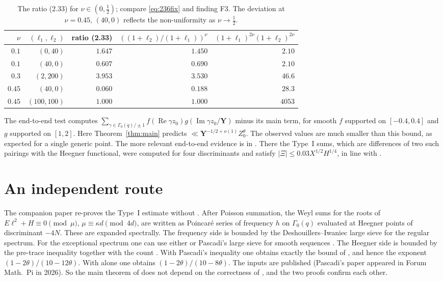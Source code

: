 \documentclass[11pt]{amsart}
\theoremstyle{remark}
\theoremstyle{definition}
\numberwithin{equation}{section}
\newcommand{\bY}{\mathbf{Y}}
\begin{document}
\begin{table}[h]
\centering
\small
\begin{tabular}{rrrrr}
\toprule
$\nu$ & $(\ell_1,\ell_2)$ & ratio (2.33) & $((1+\ell_2)/(1+\ell_1))^\nu$ & $(1+\ell_1)^{2\nu}(1+\ell_2)^{2\nu}$\\
\midrule
$0.1$ & $(0,40)$ & $1.647$ & $1.450$ & $2.10$\\
$0.1$ & $(40,0)$ & $0.607$ & $0.690$ & $2.10$\\
$0.3$ & $(2,200)$ & $3.953$ & $3.530$ & $46.6$\\
$0.45$ & $(40,0)$ & $0.060$ & $0.188$ & $28.3$\\
$0.45$ & $(100,100)$ & $1.000$ & $1.000$ & $4053$\\
\bottomrule
\end{tabular}
\caption{The ratio (2.33) for $\nu\in(0,\frac12)$; compare \eqref{eq:236fix} and finding F3. The deviation at $\nu=0.45$, $(40,0)$ reflects the non-uniformity as $\nu\to\frac12$.}\label{tab:236}
\end{table}

The end-to-end test computes $\sum_{\gamma\in\Gamma_0(q)/\pm1}f(\operatorname{Re}\gamma z_0)g(\operatorname{Im}\gamma z_0/\bY)$ minus its main term, for smooth $f$ supported on $[-0.4,0.4]$ and $g$ supported on $[1,2]$. Here Theorem~\ref{thm:main} predicts $\ll\bY^{-1/2+o(1)}Z_0^\theta$. The observed values are much smaller than this bound, as expected for a single generic point. The more relevant end-to-end evidence is in \cite[\S9]{II}. There the Type~I sums, which are differences of two such pairings with the Heegner functional, were computed for four discriminants and satisfy $|\Xi|\le0.03X^{1/2}H^{1/4}$, in line with \cite[Proposition~6.5]{II}.

\section{An independent route}\label{sec:independent}
The companion paper \cite{KUZ} re-proves the Type~I estimate \cite[Proposition~6.5]{II} without \cite{GM1}. After Poisson summation, the Weyl sums for the roots of $E\ell^2+H\equiv0\pmod\mu$, $\mu\equiv\kappa d\pmod{4d}$, are written as Poincar\'e series of frequency $h$ on $\Gamma_0(q)$ evaluated at Heegner points of discriminant $-4N$. These are expanded spectrally. The frequency side is bounded by the Deshouillers--Iwaniec large sieve \cite{DI} for the regular spectrum. For the exceptional spectrum one can use either \cite[Theorem~5]{DI} or Pascadi's large sieve for smooth sequences \cite[Theorem~2]{Pas}. The Heegner side is bounded by the pre-trace inequality together with the count \cite[Lemma~6.4]{II}. With Pascadi's inequality one obtains exactly the bound of \cite[Proposition~6.5]{II}, and hence the exponent $(1-2\theta)/(10-12\theta)$. With \cite{DI} alone one obtains $(1-2\theta)/(10-8\theta)$. The inputs \cite{DI,Pas} are published (Pascadi's paper appeared in Forum Math.\ Pi in 2026). So the main theorem of \cite{II} does not depend on the correctness of \cite{GM1}, and the two proofs confirm each other.
\end{document}
